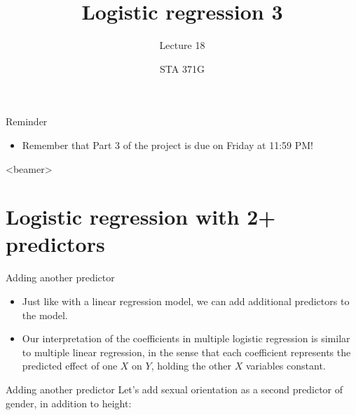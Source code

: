 \documentclass{beamer}\usepackage[]{graphicx}\usepackage[]{color}
\title{Logistic regression 3}
\subtitle{Lecture 18}
\author{STA 371G}
\begin{document}
  
  

  \frame{\maketitle}



  \begin{darkframes}
    \begin{frame}{Reminder}
      \begin{itemize}
        \item Remember that Part 3 of the project is due on Friday at 11:59 PM!
      \end{itemize}
    \end{frame}

    \begin{frame}<beamer>
      \tableofcontents
    \end{frame}

    \section{Logistic regression with 2+ predictors}

    \begin{frame}{Adding another predictor}
      \begin{itemize}
        \item Just like with a linear regression model, we can add additional predictors to the model.
        \item Our interpretation of the coefficients in multiple logistic regression is similar to multiple linear regression, in the sense that each coefficient represents the predicted effect of one $X$ on $Y$, holding the other $X$ variables constant.
      \end{itemize}
    \end{frame}

    \begin{frame}[fragile]{Adding another predictor}
      Let's add sexual orientation as a second predictor of gender, in addition to height:
      

\end{frame}
\end{darkframes}
\end{document}
